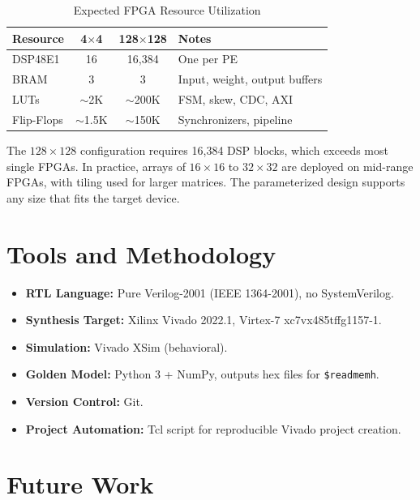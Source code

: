 \documentclass[12pt, a4paper]{article}
\begin{document}
\begin{table}[H]
\centering
\caption{Expected FPGA Resource Utilization}
\begin{tabular}{@{}lccl@{}}
\toprule
\textbf{Resource} & \textbf{4$\times$4} & \textbf{128$\times$128} & \textbf{Notes} \\
\midrule
DSP48E1   & 16      & 16,384   & One per PE \\
BRAM      & 3       & 3        & Input, weight, output buffers \\
LUTs      & $\sim$2K & $\sim$200K & FSM, skew, CDC, AXI \\
Flip-Flops & $\sim$1.5K & $\sim$150K & Synchronizers, pipeline \\
\bottomrule
\end{tabular}
\end{table}

The $128 \times 128$ configuration requires 16,384 DSP blocks, which exceeds most single FPGAs. In practice, arrays of $16 \times 16$ to $32 \times 32$ are deployed on mid-range FPGAs, with tiling used for larger matrices. The parameterized design supports any size that fits the target device.

\section{Tools and Methodology}

\begin{itemize}[leftmargin=1.5cm]
    \item \textbf{RTL Language:} Pure Verilog-2001 (IEEE 1364-2001), no SystemVerilog.
    \item \textbf{Synthesis Target:} Xilinx Vivado 2022.1, Virtex-7 xc7vx485tffg1157-1.
    \item \textbf{Simulation:} Vivado XSim (behavioral).
    \item \textbf{Golden Model:} Python 3 + NumPy, outputs hex files for \texttt{\$readmemh}.
    \item \textbf{Version Control:} Git.
    \item \textbf{Project Automation:} Tcl script for reproducible Vivado project creation.
\end{itemize}

\section{Future Work}
\end{document}
